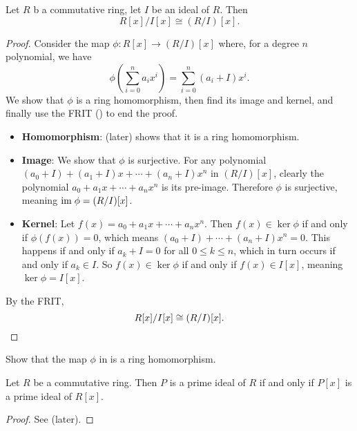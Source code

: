\begin{proposition}\label{prop-polynomial-ring-quotient-ideal-polynomial-ring-cong-quotient-polynomial-ring}
    Let $R$ b a commutative ring, let $I$ be an ideal of $R$. Then
    \[
        R[x]/I[x] \cong (R/I)[x].
    \]
\end{proposition}
\begin{proof}
    Consider the map $\phi: R[x] \to (R/I)[x]$ where, for a degree $n$ polynomial, we have
    \[
        \phi\left(\sum_{i=0}^na_ix^i\right) = \sum_{i=0}^n (a_i+I)x^i.
    \]
    We show that $\phi$ is a ring homomorphism, then find its image and kernel, and finally use the FRIT () to end the proof.
    \begin{itemize}
        \item \textbf{Homomorphism}:  (later) shows that it is a ring homomorphism.
        
        \item \textbf{Image}: We show that $\phi$ is surjective. For any polynomial $(a_0+I) + (a_1+I)x + \cdots + (a_n+I)x^n$ in $(R/I)[x]$, clearly the polynomial $a_0 + a_1x + \cdots + a_nx^n$ is its pre-image. Therefore $\phi$ is surjective, meaning $\mathrm{im}\; \phi = (R/I)[x]$.
        
        \item \textbf{Kernel}: Let $f(x) = a_0 + a_1x + \cdots + a_nx^n$. Then $f(x) \in \ker\phi$ if and only if $\phi(f(x)) = 0$, which means $(a_0+I) + \cdots + (a_n+I)x^n = 0$. This happens if and only if $a_k + I = 0$ for all $0 \leq k \leq n$, which in turn occurs if and only if $a_k \in I$. So $f(x) \in \ker\phi$ if and only if $f(x) \in I[x]$, meaning $\ker\phi = I[x]$.
    \end{itemize}
    By the FRIT,
    \[
        R[x]/I[x] \cong (R/I)[x].\qedhere
    \]
\end{proof}

\begin{exercise}\label{exercise-polynomial-ring-maps-to-quotient-polynomial-ring-is-homomorphism}
    Show that the map $\phi$ in  is a ring homomorphism.
\end{exercise}

\begin{theorem}\label{thrm-prime-ideal-iff-prime-ideal-in-polynomial-ring}
    Let $R$ be a commutative ring. Then $P$ is a prime ideal of $R$ if and only if $P[x]$ is a prime ideal of $R[x]$.
\end{theorem}
\begin{proof}
    See  (later).
\end{proof}

